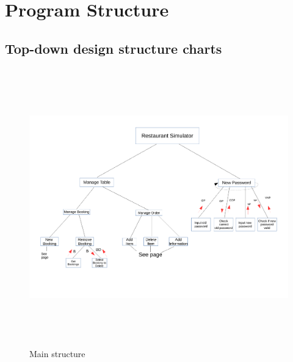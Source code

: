 \section{Program Structure}

\subsection{Top-down design structure charts}

\begin{figure}[H]
    \includegraphics[height = 12cm, angle = -90]{./Design/Images/structure1}
    \caption{Main structure} \label{fig:Structure1}
\end{figure}

